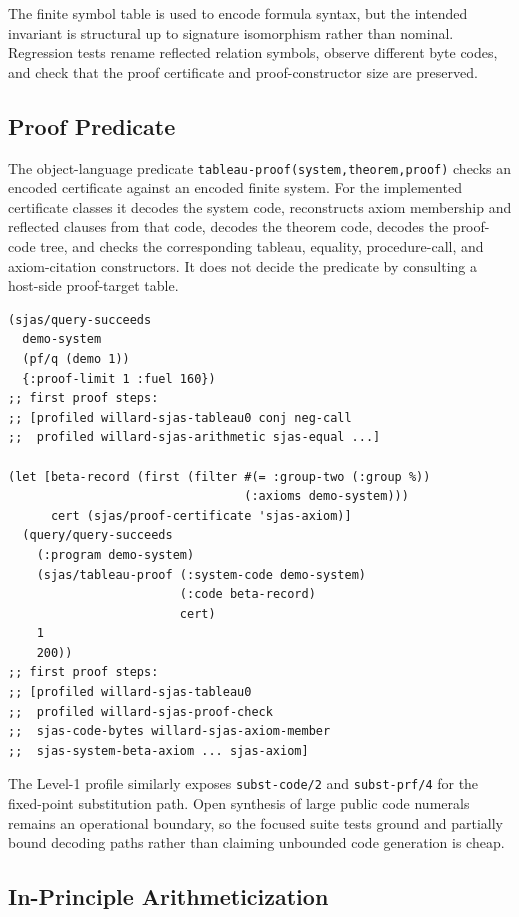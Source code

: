 \documentclass[runningheads]{llncs}
\begin{document}
The finite symbol table is used to encode formula syntax, but the intended
invariant is structural up to signature isomorphism rather than nominal.
Regression tests rename reflected relation symbols, observe different byte
codes, and check that the proof certificate and proof-constructor size are
preserved.

\subsection{Proof Predicate}

The object-language predicate \texttt{tableau-proof(system,theorem,proof)}
checks an encoded certificate against an encoded finite system.  For the
implemented certificate classes it decodes the system code, reconstructs
axiom membership and reflected clauses from that code, decodes the theorem
code, decodes the proof-code tree, and checks the corresponding tableau,
equality, procedure-call, and axiom-citation constructors.  It does not decide
the predicate by consulting a host-side proof-target table.

\begin{lstlisting}
(sjas/query-succeeds
  demo-system
  (pf/q (demo 1))
  {:proof-limit 1 :fuel 160})
;; first proof steps:
;; [profiled willard-sjas-tableau0 conj neg-call
;;  profiled willard-sjas-arithmetic sjas-equal ...]

(let [beta-record (first (filter #(= :group-two (:group %))
                                 (:axioms demo-system)))
      cert (sjas/proof-certificate 'sjas-axiom)]
  (query/query-succeeds
    (:program demo-system)
    (sjas/tableau-proof (:system-code demo-system)
                        (:code beta-record)
                        cert)
    1
    200))
;; first proof steps:
;; [profiled willard-sjas-tableau0
;;  profiled willard-sjas-proof-check
;;  sjas-code-bytes willard-sjas-axiom-member
;;  sjas-system-beta-axiom ... sjas-axiom]
\end{lstlisting}

The Level-1 profile similarly exposes \texttt{subst-code/2} and
\texttt{subst-prf/4} for the fixed-point substitution path.  Open synthesis of
large public code numerals remains an operational boundary, so the focused
suite tests ground and partially bound decoding paths rather than claiming
unbounded code generation is cheap.

\subsection{In-Principle Arithmeticization}
\end{document}
